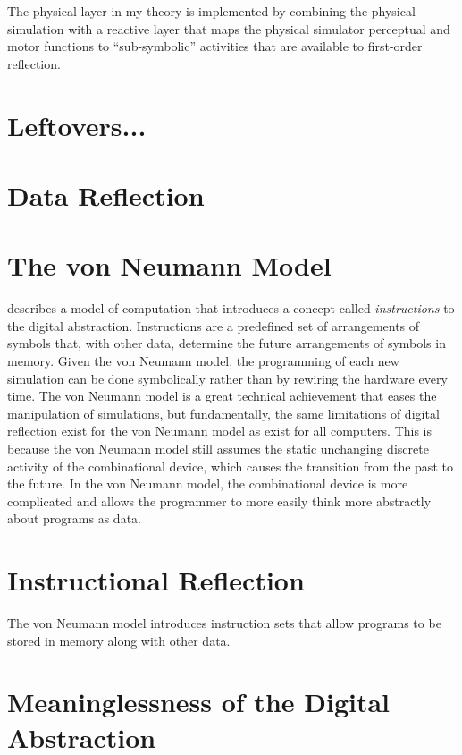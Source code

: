 The physical layer in my theory is implemented by combining the
physical simulation with a reactive layer that maps the physical
simulator perceptual and motor functions to ``sub-symbolic''
activities that are available to first-order reflection.



\section{Leftovers...}

\section{Data Reflection}



\section{The von Neumann Model}

\cite{von_neumann:1945} describes a model of computation that
introduces a concept called \emph{instructions} to the digital
abstraction.  Instructions are a predefined set of arrangements of
symbols that, with other data, determine the future arrangements of
symbols in memory.  Given the von Neumann model, the programming of
each new simulation can be done symbolically rather than by rewiring
the hardware every time.  The von Neumann model is a great technical
achievement that eases the manipulation of simulations, but
fundamentally, the same limitations of digital reflection exist for
the von Neumann model as exist for all computers.  This is because the
von Neumann model still assumes the static unchanging discrete
activity of the combinational device, which causes the transition from
the past to the future.  In the von Neumann model, the combinational
device is more complicated and allows the programmer to more easily
think more abstractly about programs as data.

\section{Instructional Reflection}

The von Neumann model introduces instruction sets that allow programs
to be stored in memory along with other data.

\section{Meaninglessness of the Digital Abstraction}



